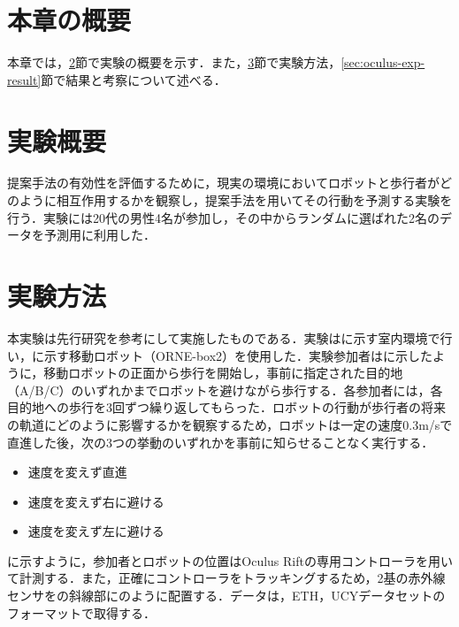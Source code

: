 

\section{本章の概要}
本章では，\ref{sec:oculus-exp-overview}節で実験の概要を示す．また，\ref{sec:oculus-exp-method}節で実験方法，\ref{sec:oculus-exp-result}節で結果と考察について述べる．

\section{実験概要}\label{sec:oculus-exp-overview}
提案手法の有効性を評価するために，現実の環境においてロボットと歩行者がどのように相互作用するかを観察し，提案手法を用いてその行動を予測する実験を行う．実験には20代の男性4名が参加し，その中からランダムに選ばれた2名のデータを予測用に利用した．

\section{実験方法}\label{sec:oculus-exp-method}
本実験は先行研究\cite{si2023-tanno}を参考にして実施したものである．実験はに示す室内環境で行い，に示す移動ロボット（ORNE-box2\cite{井口颯人2023屋外自律移動ロボットプラットフォーム-orne}）を使用した．実験参加者はに示したように，移動ロボットの正面から歩行を開始し，事前に指定された目的地（A/B/C）のいずれかまでロボットを避けながら歩行する．各参加者には，各目的地への歩行を3回ずつ繰り返してもらった．ロボットの行動が歩行者の将来の軌道にどのように影響するかを観察するため，ロボットは一定の速度0.3m/sで直進した後，次の3つの挙動のいずれかを事前に知らせることなく実行する．

\begin{itemize}
  \item 速度を変えず直進
  \item 速度を変えず右に避ける
  \item 速度を変えず左に避ける
\end{itemize}

に示すように，参加者とロボットの位置はOculus Riftの専用コントローラを用いて計測する．また，正確にコントローラをトラッキングするため，2基の赤外線センサをの斜線部にのように配置する．データは，ETH\cite{pellegrini2009you-eth}，UCY\cite{lerner2007crowds-ucy}データセットのフォーマットで取得する．


